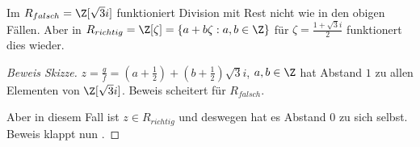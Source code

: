 \begin{theorem}
	Im $R_{falsch} = \Z[\sqrt{3}i]$ funktioniert Division mit Rest nicht wie in den obigen Fällen.
	Aber in $R_{richtig} = \Z[\zeta] = \{a+b \zeta : a,b \in \Z\} $ für $\zeta = \frac{1+\sqrt{3} i}{2}$ funktionert dies wieder.
\end{theorem}

\begin{proof}[Beweis Skizze]

$z = \frac{g}{f} = (a+\frac{1}{2}) + (b+\frac{1}{2}) \sqrt{3} i$, $a,b \in \Z$ hat Abstand $1$ zu allen Elementen von $\Z[\sqrt{3}i]$.
Beweis scheitert für $R_{falsch}$.

Aber in diesem Fall ist $z \in R_{richtig}$ und deswegen hat es Abstand $0$ zu sich selbst. Beweis klappt nun .

\end{proof}





























